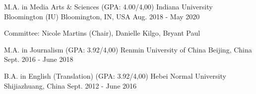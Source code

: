

\begin{cventries}

  \cventry
    {M.A. in Media Arts \& Sciences (GPA: 4.00/4,00)} %
    {Indiana University Bloomington (IU)} %
    {Bloomington, IN, USA} %
    {Aug. 2018 - May 2020} %
    {
      \begin{cvitems} %
        \item[] {Committee: Nicole Martins (Chair), Danielle Kilgo, Bryant Paul}
      \end{cvitems}
    }
    

\cventryshort
    {M.A. in Journalism (GPA: 3.92/4,00)} %
    {Renmin University of China} %
    {Beijing, China} %
    {Sept. 2016 - June 2018} %
    
\cventryshort
    {B.A. in English (Translation) (GPA: 3.92/4,00)} %
    {Hebei Normal University} %
    {Shijiazhuang, China} %
    {Sept. 2012 - June 2016} %
\end{cventries}
